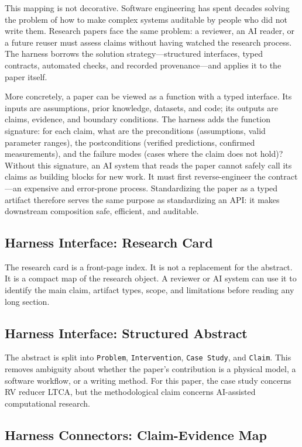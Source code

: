 \documentclass{article}
\begin{document}
This mapping is not decorative. Software engineering has spent decades solving the problem of how to make complex systems auditable by people who did not write them. Research papers face the same problem: a reviewer, an AI reader, or a future reuser must assess claims without having watched the research process. The harness borrows the solution strategy---structured interfaces, typed contracts, automated checks, and recorded provenance---and applies it to the paper itself.

More concretely, a paper can be viewed as a function with a typed interface. Its inputs are assumptions, prior knowledge, datasets, and code; its outputs are claims, evidence, and boundary conditions. The harness adds the function signature: for each claim, what are the preconditions (assumptions, valid parameter ranges), the postconditions (verified predictions, confirmed measurements), and the failure modes (cases where the claim does not hold)? Without this signature, an AI system that reads the paper cannot safely call its claims as building blocks for new work. It must first reverse-engineer the contract---an expensive and error-prone process. Standardizing the paper as a typed artifact therefore serves the same purpose as standardizing an API: it makes downstream composition safe, efficient, and auditable.

\subsection{Harness Interface: Research Card}

The research card is a front-page index. It is not a replacement for the abstract. It is a compact map of the research object. A reviewer or AI system can use it to identify the main claim, artifact types, scope, and limitations before reading any long section.

\subsection{Harness Interface: Structured Abstract}

The abstract is split into \texttt{Problem}, \texttt{Intervention}, \texttt{Case Study}, and \texttt{Claim}. This removes ambiguity about whether the paper's contribution is a physical model, a software workflow, or a writing method. For this paper, the case study concerns RV reducer LTCA, but the methodological claim concerns AI-assisted computational research.

\subsection{Harness Connectors: Claim-Evidence Map}
\end{document}
